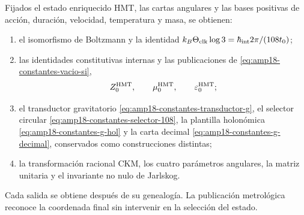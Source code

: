 \begin{theorem}
Fijados el estado enriquecido HMT, las cartas angulares y las bases positivas
de acción, duración, velocidad, temperatura y masa, se obtienen:
\begin{enumerate}
 \item el isomorfismo de Boltzmann y la identidad
 \(k_B\Theta_{\rm clk}\log3
 =\hbar_{\rm int}2\pi/(108t_0)\);
 \item las identidades constitutivas internas y las publicaciones de
 \eqref{eq:amp18-constantes-vacio-si},
 \[
  Z_0^{\rm HMT},\qquad
  \mu_0^{\rm HMT},\qquad
  \varepsilon_0^{\rm HMT};
 \]
 \item el transductor gravitatorio
 \eqref{eq:amp18-constantes-transductor-g}, el selector circular
 \eqref{eq:amp18-constantes-selector-108}, la plantilla holonómica
 \eqref{eq:amp18-constantes-g-hol} y la carta decimal
 \eqref{eq:amp18-constantes-g-decimal}, conservados como construcciones
 distintas;
 \item la transformación racional CKM, los cuatro parámetros angulares, la
 matriz unitaria y el invariante no nulo de Jarlskog.
\end{enumerate}
Cada salida se obtiene después de su genealogía. La publicación metrológica
reconoce la coordenada final sin intervenir en la selección del estado.
\end{theorem}


